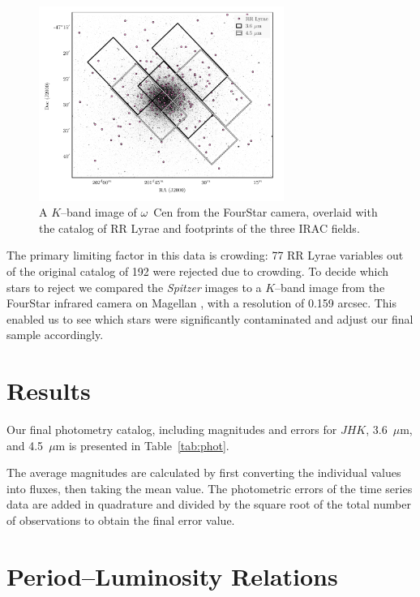 \documentclass[a4paper,fleqn,usenatbib]{mnras}
\begin{document}
\begin{figure}
\begin{center}
\includegraphics[width=80mm]{final_plots/omegacen_coverage_map.pdf}
\caption{A $K$--band image of $\omega$~Cen from the FourStar camera, overlaid with the catalog of RR Lyrae \citep{2004A&A...424.1101K} and footprints of the three IRAC fields.}
\label{fig:omegaCen_fields}
\end{center}
\end{figure}

The primary limiting factor in this data is crowding: 77 RR Lyrae variables out of the original catalog of 192 \citep{2004A&A...424.1101K} were rejected due to crowding. To decide which stars to reject we compared the {\it Spitzer} images to a $K$--band image from the FourStar infrared camera on Magellan \citep{2013PASP..125..654P}, with a resolution of 0.159 arcsec. This enabled us to see which stars were significantly contaminated and adjust our final sample accordingly. 

\section{Results}

Our final photometry catalog, including magnitudes and errors for $J\!H\!K$, 3.6~$\mu$m, and 4.5~$\mu$m is presented in Table~\ref{tab:phot}.

The average magnitudes are calculated by first converting the individual values into fluxes, then taking the mean value. The photometric errors of the time series data are added in quadrature and divided by the square root of the total number of observations to obtain the final error value.

\section{Period--Luminosity Relations}
\label{sec:pl_relation}
\end{document}
